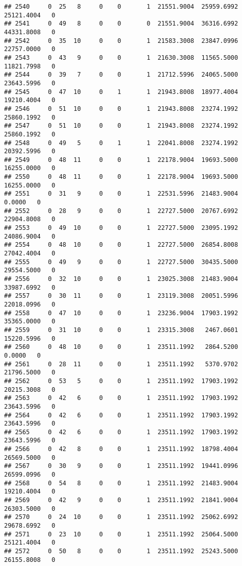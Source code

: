 \documentclass[
]{article}
\begin{document}
\begin{enumerate}
\begin{verbatim}
## 2540     0  25   8     0    0       1  21551.9004  25959.6992  25121.4004   0
## 2541     0  49   8     0    0       0  21551.9004  36316.6992  44331.8008   0
## 2542     0  35  10     0    0       1  21583.3008  23847.0996  22757.0000   0
## 2543     0  43   9     0    0       1  21630.3008  11565.5000  11821.7998   0
## 2544     0  39   7     0    0       1  21712.5996  24065.5000  23643.5996   0
## 2545     0  47  10     0    1       1  21943.8008  18977.4004  19210.4004   0
## 2546     0  51  10     0    0       1  21943.8008  23274.1992  25860.1992   0
## 2547     0  51  10     0    0       1  21943.8008  23274.1992  25860.1992   0
## 2548     0  49   5     0    1       1  22041.8008  23274.1992  20392.5996   0
## 2549     0  48  11     0    0       1  22178.9004  19693.5000  16255.0000   0
## 2550     0  48  11     0    0       1  22178.9004  19693.5000  16255.0000   0
## 2551     0  31   9     0    0       1  22531.5996  21483.9004      0.0000   0
## 2552     0  28   9     0    0       1  22727.5000  20767.6992  22904.8008   0
## 2553     0  49  10     0    0       1  22727.5000  23095.1992  24086.9004   0
## 2554     0  48  10     0    0       1  22727.5000  26854.8008  27042.4004   0
## 2555     0  49   9     0    0       1  22727.5000  30435.5000  29554.5000   0
## 2556     0  32  10     0    0       1  23025.3008  21483.9004  33987.6992   0
## 2557     0  30  11     0    0       1  23119.3008  20051.5996  22018.0996   0
## 2558     0  47  10     0    0       1  23236.9004  17903.1992  35365.0000   0
## 2559     0  31  10     0    0       1  23315.3008   2467.0601  15220.5996   0
## 2560     0  48  10     0    0       1  23511.1992   2864.5200      0.0000   0
## 2561     0  28  11     0    0       1  23511.1992   5370.9702  21796.5000   0
## 2562     0  53   5     0    0       1  23511.1992  17903.1992  20215.3008   0
## 2563     0  42   6     0    0       1  23511.1992  17903.1992  23643.5996   0
## 2564     0  42   6     0    0       1  23511.1992  17903.1992  23643.5996   0
## 2565     0  42   6     0    0       1  23511.1992  17903.1992  23643.5996   0
## 2566     0  42   8     0    0       1  23511.1992  18798.4004  26569.5000   0
## 2567     0  30   9     0    0       1  23511.1992  19441.0996  26599.0996   0
## 2568     0  54   8     0    0       1  23511.1992  21483.9004  19210.4004   0
## 2569     0  42   9     0    0       1  23511.1992  21841.9004  26303.5000   0
## 2570     0  24  10     0    0       1  23511.1992  25062.6992  29678.6992   0
## 2571     0  23  10     0    0       1  23511.1992  25064.5000  25121.4004   0
## 2572     0  50   8     0    0       1  23511.1992  25243.5000  26155.8008   0

\end{verbatim}
\end{enumerate}
\end{document}
